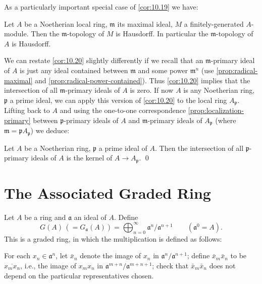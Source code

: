 As a particularly important special case of \eqref{cor:10.19} we have:

\begin{corollary}\label{cor:10.20}
    Let $A$ be a Noetherian local ring, $\mathfrak{m}$ its maximal ideal, $M$ a finitely-generated $A$-module. Then the $\mathfrak{m}$-topology of $M$ is Hausdorff. In particular the $\mathfrak{m}$-topology of $A$ is Hausdorff. 
\end{corollary}

We can restate \eqref{cor:10.20} slightly differently if we recall that an $\mathfrak{m}$-primary ideal of $A$ is just any ideal contained between $\mathfrak{m}$ and some power $\mathfrak{m}^n$ (use \eqref{prop:radical-maximal} and \eqref{prop:radical-power-contained}). Thus \eqref{cor:10.20} implies that the intersection of all $\mathfrak{m}$-primary ideals of $A$ is zero. If now $A$ is any Noetherian ring, $\mathfrak{p}$ a prime ideal, we can apply this version of \eqref{cor:10.20} to the local ring $A_{\mathfrak{p}}$. Lifting back to $A$ and using the one-to-one correspondence \eqref{prop:localization-primary} between $\mathfrak{p}$-primary ideals of $A$ and $\mathfrak{m}$-primary ideals of $A_{\mathfrak{p}}$ (where $\mathfrak{m} = \mathfrak{p}A_{\mathfrak{p}}$) we deduce:

\begin{corollary}\label{cor:10.21}
    Let $A$ be a Noetherian ring, $\mathfrak{p}$ a prime ideal of $A$. Then the intersection of all $\mathfrak{p}$-primary ideals of $A$ is the kernel of $A \to A_{\mathfrak{p}}$. \qed
\end{corollary}

\section*{The Associated Graded Ring}
Let $A$ be a ring and $\mathfrak{a}$ an ideal of $A$. Define
\[
G(A) \,(= G_{\mathfrak{a}}(A)) = \bigoplus_{n=0}^{\infty} \mathfrak{a}^n/\mathfrak{a}^{n+1} \qquad (\mathfrak{a}^0 = A).
\]
This is a graded ring, in which the multiplication is defined as follows:

For each $x_n \in \mathfrak{a}^n$, let $\bar{x}_n$ denote the image of $x_n$ in $\mathfrak{a}^n/\mathfrak{a}^{n+1}$; define $\bar{x}_m \bar{x}_n$ to be $\overline{x_m x_n}$, i.e., the image of $x_m x_n$ in $\mathfrak{a}^{m+n}/\mathfrak{a}^{m+n+1}$; check that $\bar{x}_m \bar{x}_n$ does not depend on the particular representatives chosen.

